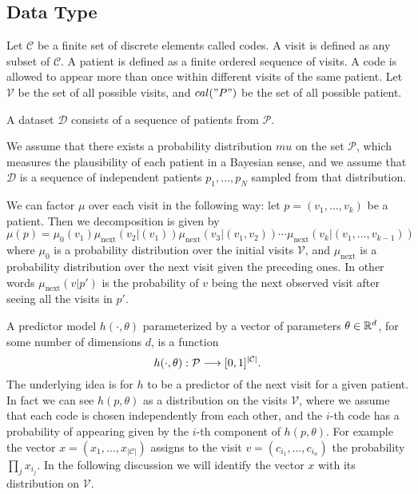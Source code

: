 \documentclass[]{marticle}
\newcommand{\ds}{\mathcal{D}}
\newcommand{\codes}{\mathcal{C}}
\newcommand{\patients}{\mathcal{P}}
\newcommand{\visits}{\mathcal{V}}
\begin{document}
\subsection{Data Type} \label{sect-datashape}

Let $\codes$ be a finite set of discrete elements called codes. A visit is defined as any subset
of $\codes$. A patient is defined as a finite ordered sequence of visits. A code is allowed to
appear more than once within different visits of the same patient. Let $\visits$ be the set of all
possible visits, and $cal("P")$ be the set of all possible patient.

A dataset $\ds$ consists of a sequence of patients from $\patients$.

We assume that there exists a probability distribution $mu$ on the set $\patients$, which measures
the plausibility of each patient in a Bayesian sense, and we assume that $\ds$ is a sequence of
independent patients $p_1, \dots, p_N$ sampled from that distribution.

We can factor $\mu$ over each visit in the following way: let $p=(v_1, \dots, v_k)$ be a patient. Then
we decomposition is given by
$$ \mu(p) = \mu_0(v_1) \mu_\text{next} (v_2 | (v_1)) \mu_\text{next} (v_3 |
    (v_1, v_2)) \cdots \mu_\text{next} (v_k | (v_1, \dots, v_{k-1})) $$
where $\mu_0$ is a probability distribution over the initial visits $\visits$, and $\mu_\text{next}$ is a
probability distribution over the next visit given the preceding ones. In other words $\mu_\text{next} (v
| p')$ is the probability of $v$ being the next observed visit after seeing all the visits in $p'$.

A predictor model $h(\cdot, \theta)$ parameterized by a vector of parameters $\theta \in \mathbb{R}^d$, for some
number of dimensions $d$, is a function
$$ h(\cdot, \theta) : \patients \arr [0,1]^{|\codes|}. $$
The underlying idea is for $h$ to be a predictor of the next visit for a given patient. In fact we
can see $h(p, \theta)$ as a distribution on the visits $\visits$, where we assume that each code is
chosen independently from each other, and the $i$-th code has a probability of appearing given by
the $i$-th component of $h(p, \theta)$. For example the vector $x=(x_1, \dots, x_{|\codes|})$ assigns
to the visit $v=(c_{i_1}, \dots, c_{i_n})$ the probability $\prod_j x_{i_j}$. In the following
discussion we will identify the vector $x$ with its distribution on $\visits$.
\end{document}
